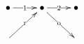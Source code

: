 \begin{displaymath}
    \xymatrix{ \bullet \ar[r]| {\linkmlone} & \bullet   \ar[r]| {\linkmltwo} \ar[dr]| {\linkoff} & \bullet  \\
			    \ar[ur]|{\linkon}  &   &  }
\end{displaymath}